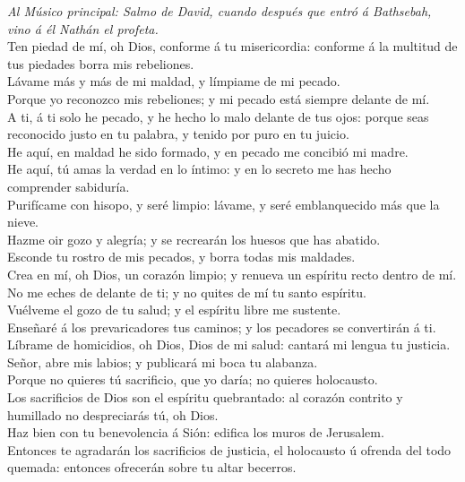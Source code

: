  \emph{Al Músico principal: Salmo de David, cuando después
que entró á Bathsebah, vino á él Nathán el profeta.}\\
Ten piedad de mí, oh Dios, conforme á tu misericordia: conforme á la
multitud de tus piedades borra mis rebeliones.\\
 Lávame más y más de mi maldad, y límpiame de mi pecado.\\
 Porque yo reconozco mis rebeliones; y mi pecado está
siempre delante de mí.\\
 A ti, á ti solo he pecado, y he hecho lo malo delante de
tus ojos: porque seas reconocido justo en tu palabra, y tenido por puro
en tu juicio.\\
 He aquí, en maldad he sido formado, y en pecado me concibió
mi madre.\\
 He aquí, tú amas la verdad en lo íntimo: y en lo secreto me
has hecho comprender sabiduría.\\
 Purifícame con hisopo, y seré limpio: lávame, y seré
emblanquecido más que la nieve.\\
 Hazme oir gozo y alegría; y se recrearán los huesos que has
abatido.\\
 Esconde tu rostro de mis pecados, y borra todas mis
maldades.\\
 Crea en mí, oh Dios, un corazón limpio; y renueva un
espíritu recto dentro de mí.\\
 No me eches de delante de ti; y no quites de mí tu santo
espíritu.\\
 Vuélveme el gozo de tu salud; y el espíritu libre me
sustente.\\
 Enseñaré á los prevaricadores tus caminos; y los pecadores
se convertirán á ti.\\
 Líbrame de homicidios, oh Dios, Dios de mi salud: cantará
mi lengua tu justicia.\\
 Señor, abre mis labios; y publicará mi boca tu alabanza.\\
 Porque no quieres tú sacrificio, que yo daría; no quieres
holocausto.\\
 Los sacrificios de Dios son el espíritu quebrantado: al
corazón contrito y humillado no despreciarás tú, oh Dios.\\
 Haz bien con tu benevolencia á Sión: edifica los muros de
Jerusalem.\\
 Entonces te agradarán los sacrificios de justicia, el
holocausto ú ofrenda del todo quemada: entonces ofrecerán sobre tu altar
becerros.

